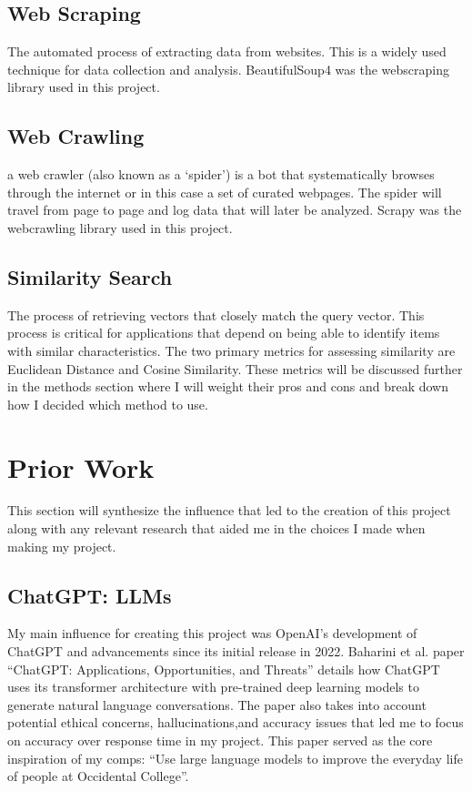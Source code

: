 \documentclass[10pt,twocolumn]{article}
\begin{document}
\subsection {Web Scraping \cite{wikipedia_web_scraping} } The automated process of extracting data from websites. This is a widely used technique for data collection and analysis. BeautifulSoup4 was the webscraping library used in this project.
\vspace{10pt}
\subsection {Web Crawling \cite{botscraper_web_crawling}} a web crawler (also known as a ‘spider’) is a bot that systematically browses through the internet or in this case a set of curated webpages. The spider will travel from page to page and log data that will later be analyzed. Scrapy was the webcrawling library used in this project.
\vspace{10pt}
\subsection {Similarity Search \cite{mljourney_cosine_euclidean}} The process of retrieving vectors that closely match the query vector. This process is critical for applications that depend on being able to identify items with similar characteristics. The two primary metrics for assessing similarity are Euclidean Distance and Cosine Similarity. These metrics will be discussed further in the methods section where I will weight their pros and cons and break down how I decided which method to use.

\section{Prior Work}
This section will synthesize the influence that led to the creation of this project along with any relevant research that aided me in the choices I made when making my project.
\subsection{ChatGPT: LLMs}
My main influence for creating this project was OpenAI’s development of ChatGPT and advancements since its initial release in 2022. Baharini et al. paper “ChatGPT: Applications, Opportunities, and Threats” \cite{arxivChatGPTApplications} details how ChatGPT uses its transformer architecture with pre-trained deep learning models to generate natural language conversations. The paper also takes into account potential ethical concerns, hallucinations,and accuracy issues that led me to focus on accuracy over response time in my project. This paper served as the core inspiration of my comps: “Use large language models to improve the everyday life of people at Occidental College”.
\end{document}
